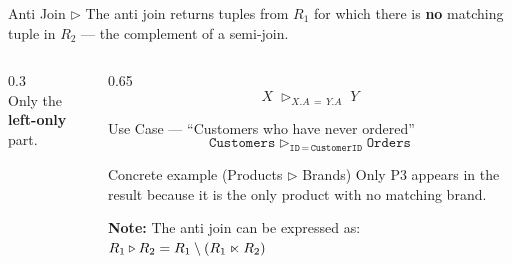 \begin{frame}{Anti Join $\triangleright$}
  The anti join returns tuples from $R_1$ for which there is \textbf{no}
  matching tuple in $R_2$ --- the complement of a semi-join.

  \begin{columns}[c]
    \begin{column}{0.3\textwidth}
      \centering
      \\[4pt]
      \small Only the \textbf{left-only} part.
    \end{column}
    \begin{column}{0.65\textwidth}
      \[
        X \;\triangleright_{X.A\,=\,Y.A}\; Y
      \]

      \begin{examples}{Use Case --- ``Customers who have never ordered''}
        \[
          \texttt{Customers} \;\triangleright_{\texttt{ID}\,=\,\texttt{CustomerID}}\; \texttt{Orders}
        \]
      \end{examples}

      \begin{examples}{Concrete example (Products $\triangleright$ Brands)}
        Only P3 appears in the result because it is the only product with no
        matching brand.
      \end{examples}

      \vspace{4pt}
      \textbf{Note:} The anti join can be expressed as:\\
      $R_1 \triangleright R_2 = R_1 \setminus (R_1 \ltimes R_2)$
    \end{column}
  \end{columns}
\end{frame}

